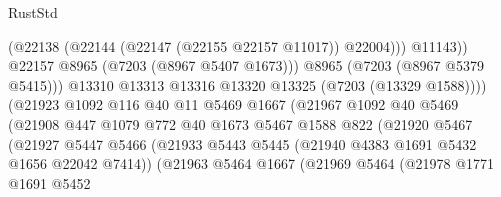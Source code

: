 \begin{lexlean}{RustStd}
\begin{coremodule}
                                                (@22138
                                                  (@22144 (@22147 (@22155 @22157 @11017)) @22004)))
                                              @11143))
                                          @22157
                                          @8965
                                          (@7203 (@8967 @5407 @1673)))
                                        @8965
                                        (@7203 (@8967 @5379 @5415)))
                                      @13310
                                      @13313
                                      @13316
                                      @13320
                                      @13325
                                      (@7203 (@13329 @1588))))
                                  (@21923
                                    @1092
                                    @116
                                    @40
                                    @11
                                    @5469
                                    @1667
                                    (@21967
                                      @1092
                                      @40
                                      @5469
                                      (@21908
                                        @447
                                        @1079
                                        @772
                                        @40
                                        @1673
                                        @5467
                                        @1588
                                        @822
                                        (@21920
                                          @5467
                                          (@21927
                                            @5447
                                            @5466
                                            (@21933
                                              @5443
                                              @5445
                                              (@21940 @4383 @1691 @5432 @1656 @22042 @7414))
                                            (@21963
                                              @5464
                                              @1667
                                              (@21969
                                                @5464
                                                (@21978
                                                  @1771
                                                  @1691
                                                  @5452

\end{coremodule}
\end{lexlean}

